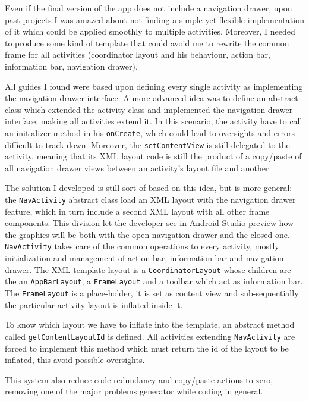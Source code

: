 			Even if the final version of the app does not include a navigation drawer, upon past projects I was amazed about not finding a simple yet flexible implementation of it which could be applied smoothly to multiple activities.
			Moreover, I needed to produce some kind of template that could avoid me to rewrite the common frame for all activities (coordinator layout and his behaviour, action bar, information bar, navigation drawer).
			
			All guides I found were based upon defining every single activity as implementing the navigation drawer interface.
			A more advanced idea was to define an abstract class which extended the activity class and implemented the navigation drawer interface, making all activities extend it.
			In this scenario, the activity have to call an initializer method in his \lstinline|onCreate|, which could lead to oversights and errors difficult to track down. Moreover, the \lstinline|setContentView| is still delegated to the activity, meaning that its XML layout code is still the product of a copy/paste of all navigation drawer views between an activity's layout file and another.
			
			The solution I developed is still sort-of based on this idea, but is more general: the \lstinline|NavActivity| abstract class load an XML layout with the navigation drawer feature, which in turn include a second XML layout with all other frame components.
			This division let the developer see in Android Studio preview how the graphics will be both with the open navigation drawer and the closed one.
			\lstinline|NavActivity| takes care of the common operations to every activity, mostly initialization and management of action bar, information bar and navigation drawer.
			The XML template layout is a \lstinline|CoordinatorLayout| whose children are the an \lstinline|AppBarLayout|, a \lstinline|FrameLayout| and a toolbar which act as information bar.
			The \lstinline|FrameLayout| is a place-holder, it is set as content view and sub-sequentially the particular activity layout is inflated inside it.
			
			To know which layout we have to inflate into the template, an abstract method called \lstinline|getContentLayoutId| is defined.
			All activities extending \lstinline|NavActivity| are forced to implement this method which must return the id of the layout to be inflated, this avoid possible oversights.
			
			This system also reduce code redundancy and copy/paste actions to zero, removing one of the major problems generator while coding in general.
		
